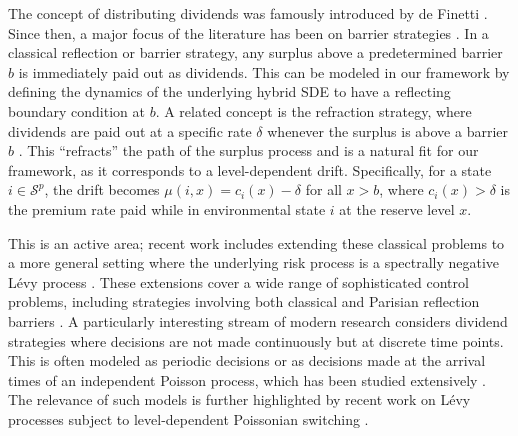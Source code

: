 \documentclass[11pt]{article}
\numberwithin{table}{section}
\numberwithin{figure}{section}
\numberwithin{equation}{section}
\newcommand{\1}{{\mathbf 1}}
\newcommand{\0}{\mat{0}}
\begin{document}
The concept of distributing dividends was famously introduced by de Finetti \cite{definetti1957dividens}. Since then, a major focus of the literature has been on barrier strategies \cite{avanzi2009strategies}. In a classical reflection or barrier strategy, any surplus above a predetermined barrier \(b\) is immediately paid out as dividends. This can be modeled in our framework by defining the dynamics of the underlying hybrid SDE to have a reflecting boundary condition at \(b\). A related concept is the refraction strategy, where dividends are paid out at a specific rate \(\delta\) whenever the surplus is above a barrier \(b\) \cite{gerber2006optimal}. This ``refracts'' the path of the surplus process and is a natural fit for our framework, as it corresponds to a level-dependent drift. Specifically, for a state \(i \in \mathcal{S}^p\), the drift becomes \(\mu(i,x) = c_i(x) - \delta\) for all \(x > b\), where \(c_i(x)>\delta\) is the premium rate paid while in environmental state $i$ at the reserve level $x$.

This is an active area; recent work includes extending these classical problems to a more general setting where the underlying risk process is a spectrally negative Lévy process \cite{avram2004exit}. These extensions cover a wide range of sophisticated control problems, including strategies involving both classical and Parisian reflection barriers \cite{avram2018spectrally}. A particularly interesting stream of modern research considers dividend strategies where decisions are not made continuously but at discrete time points. This is often modeled as periodic decisions or as decisions made at the arrival times of an independent Poisson process, which has been studied extensively \cite{albrecher2011optimal, albrecher2011randomized, albrecher2013randomized, zhao2017optimal, noba2018optimal, cheung2019periodic}. The relevance of such models is further highlighted by recent work on Lévy processes subject to level-dependent Poissonian switching \cite{beelders2025evy}.
\end{document}
